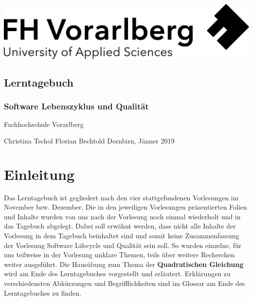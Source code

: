 \documentclass[a4paper,12pt,twoside]{scrreprt}
\begin{document}
\cleardoublepage   %
\thispagestyle{empty}
\begin{titlepage}
  \begin{flushright}
  \includegraphics[width=0.4\linewidth]{Logo-A3}
  \end{flushright}
  \begin{flushleft}
  \section*{Lerntagebuch}
  \subsection*{Software Lebenszyklus und Qualität}

  \vfill
  

  Fachhochschule Vorarlberg\newline

  \vspace{0.5cm}
  
  \vspace{0.5cm}
  
  Christina Tschol\newline
  Florian Bechtold\newline
  Dornbirn, Jänner 2019
  \end{flushleft}
\end{titlepage}


\cleardoublepage   %
\tableofcontents

\clearpage
{}
{}
\listoffigures


\chapter{Einleitung}
Das Lerntagebuch ist gegliedert nach den vier stattgefundenen Vorlesungen im November bzw. Dezember. Die in den jeweiligen Vorlesungen präsentierten Folien und Inhalte wurden von uns nach der
Vorlesung noch einmal wiederholt und in das Tagebuch abgelegt. Dabei soll erwähnt werden, dass nicht alle Inhalte der Vorlesung in dem Tagebuch beinhaltet sind und somit keine Zusammenfassung
der Vorlesung Software Lifecycle und Qualität sein soll. So wurden einzelne, für uns teilweise in der Vorlesung unklare Themen, teils über weitere Recherchen weiter ausgeführt. 
\newline
Die Hausübung zum Thema der \textbf{Quadratischen Gleichung} wird am Ende des Lerntagebuches vorgestellt und erläutert. Erklärungen zu verschiedensten Abkürzungen und Begrifflichkeiten sind im Glossar am Ende des Lerntagebuches zu finden.
\end{document}
